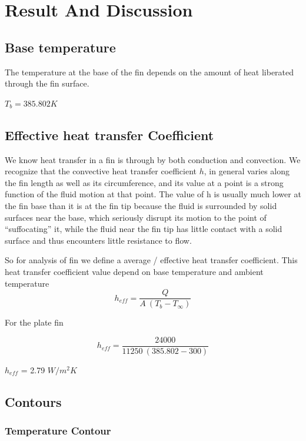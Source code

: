 \section{Result And Discussion}

\subsection{Base temperature}

The temperature at the base of the fin depends on the amount of heat liberated through the fin surface. 

$ T_b = 385.802 K $


\subsection{ Effective heat transfer Coefficient}

We know heat transfer in a fin is through by both conduction and convection. We recognize that the convective heat transfer coefficient $h$, in general varies along the fin length as well as its circumference, and its value at a point is a strong function of the fluid motion at that point. The value of h is usually much lower at the fin base than it is at the fin tip because the fluid is surrounded by solid surfaces near the base, which seriously disrupt its motion to the point of “suffocating” it, while the fluid near the fin tip has little contact with a solid surface and thus encounters little resistance to flow.

So for analysis of fin we define a average / effective heat transfer coefficient. This heat transfer coefficient value depend on base temperature and ambient temperature
\begin{equation}
h_{eff} =  \frac{Q}{A \ (T_b - T_\infty)}
\end{equation} 


For the plate fin


\begin{equation}
h_{eff} =  \frac{24000}{11250 \ (385.802 - 300)}
\end{equation} 


$ h_{eff} $ =  2.79 $W / m^2 K $

\subsection{Contours}

\subsubsection{Temperature Contour}

